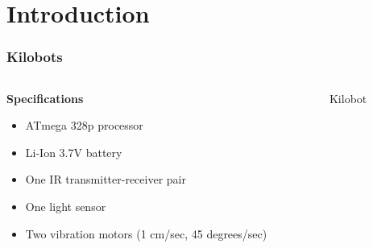 \section{Introduction}
\begin{frame}
	\frametitle{Kilobots}
	\begin{columns}		
		\begin{column}{0.5\textwidth}
			\textbf{Specifications}
			\vspace{0.2cm}
			\begin{itemize}
				\item ATmega 328p processor 
				\item Li-Ion 3.7V battery 
				\item One IR transmitter-receiver pair 
				\item One light sensor 
				\item Two vibration motors (1 cm/sec, 45 degrees/sec)
			\end{itemize}
		\end{column}
	\begin{column}{0.5\textwidth}
		\begin{figure}
			\centering
			\vspace{0.2cm}
			\caption{Kilobot}
		\end{figure}
	\end{column}
	\end{columns}
\end{frame}

